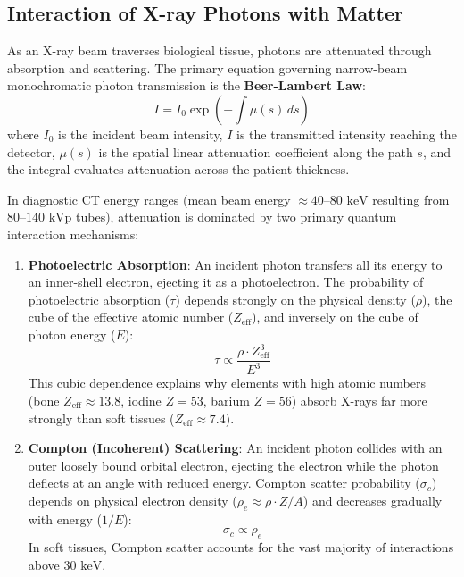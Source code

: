\documentclass[11pt,a4paper]{article}
\begin{document}
\subsection{Interaction of X-ray Photons with Matter}
As an X-ray beam traverses biological tissue, photons are attenuated through absorption and scattering. The primary equation governing narrow-beam monochromatic photon transmission is the \textbf{Beer-Lambert Law}:
\begin{equation}
    I = I_0 \exp\left(-\int \mu(s) \, ds\right)
\end{equation}
where $I_0$ is the incident beam intensity, $I$ is the transmitted intensity reaching the detector, $\mu(s)$ is the spatial linear attenuation coefficient along the path $s$, and the integral evaluates attenuation across the patient thickness.

In diagnostic CT energy ranges (mean beam energy $\approx 40\text{--}80\text{ keV}$ resulting from $80\text{--}140\text{ kVp}$ tubes), attenuation is dominated by two primary quantum interaction mechanisms:
\begin{enumerate}
    \item \textbf{Photoelectric Absorption}: An incident photon transfers all its energy to an inner-shell electron, ejecting it as a photoelectron. The probability of photoelectric absorption ($\tau$) depends strongly on the physical density ($\rho$), the cube of the effective atomic number ($Z_{\text{eff}}$), and inversely on the cube of photon energy ($E$):
    \begin{equation}
        \tau \propto \frac{\rho \cdot Z_{\text{eff}}^3}{E^3}
    \end{equation}
    This cubic dependence explains why elements with high atomic numbers (bone $Z_{\text{eff}} \approx 13.8$, iodine $Z=53$, barium $Z=56$) absorb X-rays far more strongly than soft tissues ($Z_{\text{eff}} \approx 7.4$).
    \item \textbf{Compton (Incoherent) Scattering}: An incident photon collides with an outer loosely bound orbital electron, ejecting the electron while the photon deflects at an angle with reduced energy. Compton scatter probability ($\sigma_c$) depends on physical electron density ($\rho_e \approx \rho \cdot Z/A$) and decreases gradually with energy ($1/E$):
    \begin{equation}
        \sigma_c \propto \rho_e
    \end{equation}
    In soft tissues, Compton scatter accounts for the vast majority of interactions above $30\text{ keV}$.
\end{enumerate}
\end{document}
